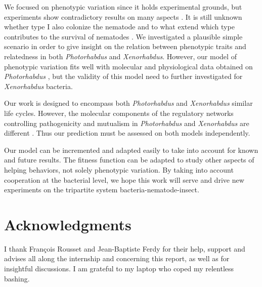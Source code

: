 \documentclass[10pt]{article}
\newcommand{\Xeno}{\textit{Xenorhabdus} }
\newcommand{\Photo}{\textit{Photorhabdus} }
\begin{document}
\begin{multicols}{2}
We focused on phenotypic variation since it holds experimental grounds, but experiments show contradictory results on many aspects \cite{Somvanshi2012}.
It is still unknown whether type I also colonize the nematode and to what extend which type contributes to the survival of nematodes \cite{Waterfield2009}. 
We investigated a plausible simple scenario in order to give insight on the relation between phenotypic traits and relatedness in both \Photo and \textit{Xenorhabdus}.
However, our model of phenotypic variation fits well with molecular and physiological data obtained on \textit{Photorhabdus} \cite{Somvanshi2012}, but the validity of this model need to further investigated for \Xeno bacteria. 

Our work is designed to encompass both \Photo and \Xeno similar life cycles.  
However, the molecular components of the regulatory networks controlling pathogenicity and mutualism in \Photo and \Xeno are different \cite{Goodrich-Blair2007}. 
Thus our prediction must be assessed on both models independently.

Our model can be incremented and adapted easily to take into account for known and future results.
The fitness function can be adapted to study other aspects of helping behaviors, not solely phenotypic variation.
By taking into account cooperation at the bacterial level, we hope this work will serve and drive new experiments on the tripartite system bacteria-nematode-insect.
\section*{Acknowledgments}
I thank François Rousset and Jean-Baptiste Ferdy for their help, support and advises all along the internship and concerning this report, as well as for insightful discussions.
I am grateful to my laptop who coped my relentless bashing.
\end{multicols}
\end{document}
